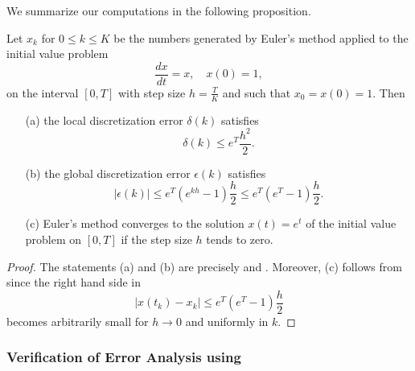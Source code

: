 \documentclass{ximera}
\begin{document}
We summarize our computations in the following proposition.
\begin{prop}  \label{prop:globerr1}
Let $x_k$ for $0\le k\le K$ be the numbers generated by
Euler's method applied to the initial value problem
\[
\frac{dx}{dt} = x,\quad x(0)=1,
\]
on the interval $[0,T]$ with step size $h=\frac{T}{K}$ and
such that $x_0=x(0)=1$. Then
\begin{itemize}
\item[(a)] the local discretization error $\delta(k)$ satisfies
\[
\delta(k)\le e^T\frac{h^2}{2}.
\]
\item[(b)] the global discretization error $\epsilon(k)$ satisfies
\[
|\epsilon(k)| \le e^T(e^{kh}-1)\frac{h}{2} \le e^T(e^T-1)\frac{h}{2}.
\]
\item[(c)]  Euler's method 
converges to the solution $x(t)=e^t$ of
the initial value problem on $[0,T]$ if the step size $h$ tends
to zero.
\end{itemize}
\end{prop}

\begin{proof} The statements (a) and (b) are precisely  and
. Moreover, (c) follows from  
since the right hand side in
\[
|x(t_k)-x_k| \le e^T(e^T-1)\frac{h}{2}
\]
becomes arbitrarily small for $h\to 0$ and uniformly in $k$.
\end{proof}

\subsubsection*{Verification of Error Analysis using \Matlab}
\end{document}
